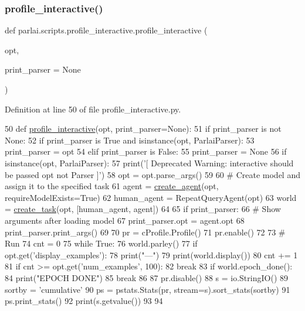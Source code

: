 \subsubsection{\texorpdfstring{profile\+\_\+interactive()}{profile\_interactive()}}
{\footnotesize\ttfamily def parlai.\+scripts.\+profile\+\_\+interactive.\+profile\+\_\+interactive (\begin{DoxyParamCaption}\item[{}]{opt,  }\item[{}]{print\+\_\+parser = {\ttfamily None} }\end{DoxyParamCaption})}



Definition at line 50 of file profile\+\_\+interactive.\+py.


\begin{DoxyCode}
50 \textcolor{keyword}{def }\hyperlink{namespaceparlai_1_1scripts_1_1profile__interactive_a5657fbf0eae34d1a0e5b48df3a7ded54}{profile\_interactive}(opt, print\_parser=None):
51     \textcolor{keywordflow}{if} print\_parser \textcolor{keywordflow}{is} \textcolor{keywordflow}{not} \textcolor{keywordtype}{None}:
52         \textcolor{keywordflow}{if} print\_parser \textcolor{keywordflow}{is} \textcolor{keyword}{True} \textcolor{keywordflow}{and} isinstance(opt, ParlaiParser):
53             print\_parser = opt
54         \textcolor{keywordflow}{elif} print\_parser \textcolor{keywordflow}{is} \textcolor{keyword}{False}:
55             print\_parser = \textcolor{keywordtype}{None}
56     \textcolor{keywordflow}{if} isinstance(opt, ParlaiParser):
57         print(\textcolor{stringliteral}{'[ Deprecated Warning: interactive should be passed opt not Parser ]'})
58         opt = opt.parse\_args()
59 
60     \textcolor{comment}{# Create model and assign it to the specified task}
61     agent = \hyperlink{namespaceparlai_1_1core_1_1agents_a00d77a7e26fb89e8bd900f7b2a02982a}{create\_agent}(opt, requireModelExists=\textcolor{keyword}{True})
62     human\_agent = RepeatQueryAgent(opt)
63     world = \hyperlink{namespaceparlai_1_1core_1_1worlds_a79969c7ba76d4b3c500f5bb776444dc6}{create\_task}(opt, [human\_agent, agent])
64 
65     \textcolor{keywordflow}{if} print\_parser:
66         \textcolor{comment}{# Show arguments after loading model}
67         print\_parser.opt = agent.opt
68         print\_parser.print\_args()
69 
70     pr = cProfile.Profile()
71     pr.enable()
72 
73     \textcolor{comment}{# Run}
74     cnt = 0
75     \textcolor{keywordflow}{while} \textcolor{keyword}{True}:
76         world.parley()
77         \textcolor{keywordflow}{if} opt.get(\textcolor{stringliteral}{'display\_examples'}):
78             print(\textcolor{stringliteral}{"---"})
79             print(world.display())
80         cnt += 1
81         \textcolor{keywordflow}{if} cnt >= opt.get(\textcolor{stringliteral}{'num\_examples'}, 100):
82             \textcolor{keywordflow}{break}
83         \textcolor{keywordflow}{if} world.epoch\_done():
84             print(\textcolor{stringliteral}{"EPOCH DONE"})
85             \textcolor{keywordflow}{break}
86 
87     pr.disable()
88     s = io.StringIO()
89     sortby = \textcolor{stringliteral}{'cumulative'}
90     ps = pstats.Stats(pr, stream=s).sort\_stats(sortby)
91     ps.print\_stats()
92     print(s.getvalue())
93 
94 
\end{DoxyCode}

